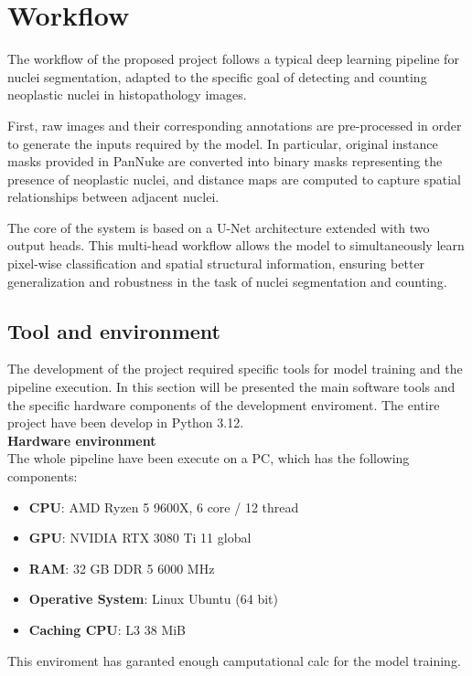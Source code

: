 \documentclass[target=bach,aauheader=,style=]{thud}
\begin{document}
\section{Workflow}

The workflow of the proposed project follows a typical deep learning pipeline for nuclei segmentation, adapted to the specific goal of detecting and counting neoplastic nuclei in histopathology images.

First, raw images and their corresponding annotations are pre-processed in order to generate the inputs required by the model. In particular, original instance masks provided in PanNuke are converted into binary masks representing the presence of neoplastic nuclei, and distance maps are computed to capture spatial relationships between adjacent nuclei.

The core of the system is based on a U-Net \cite{DBLP:journals/corr/RonnebergerFB15} architecture extended with two output heads. This multi-head workflow allows the model to simultaneously learn pixel-wise classification and spatial structural information, ensuring better generalization and robustness in the task of nuclei segmentation and counting.
\subsection{Tool and environment}
The development of the project required specific tools for model training and the pipeline execution. In this section will be presented the main software tools and the specific hardware components of the development enviroment. The entire project have been develop in Python 3.12.\\

\noindent\textbf{Hardware environment}\\

\noindent The whole pipeline have been execute on a PC, which has the following components:
\begin{itemize}
    \item \textbf{CPU}: AMD Ryzen 5 9600X, 6 core / 12 thread
    \item \textbf{GPU}: NVIDIA RTX 3080 Ti 11 global
    \item \textbf{RAM}: 32 GB DDR 5 6000 MHz
    \item \textbf{Operative System}: Linux Ubuntu (64 bit)
    \item \textbf{Caching CPU}: L3 38 MiB
\end{itemize}
This enviroment has garanted enough camputational calc for the model training.
\end{document}
